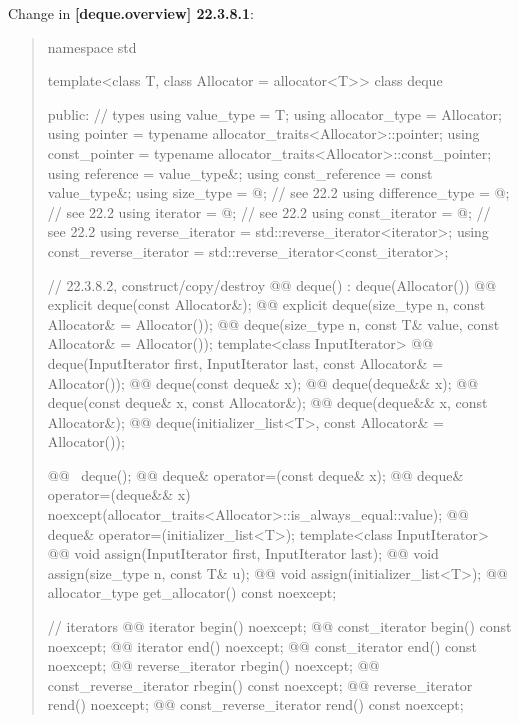 \documentclass{wg21}
\begin{document}
Change in \textbf{[deque.overview] 22.3.8.1}:
\begin{quote}
\begin{codeblock}
namespace std {
  template<class T, class Allocator = allocator<T>>
  class deque {
  public:
    // types
    using value_type             = T;
    using allocator_type         = Allocator;
    using pointer                = typename allocator_traits<Allocator>::pointer;
    using const_pointer          = typename allocator_traits<Allocator>::const_pointer;
    using reference              = value_type&;
    using const_reference        = const value_type&;
    using size_type              = @\impdef@; // see 22.2
    using difference_type        = @\impdef@; // see 22.2
    using iterator               = @\impdef@; // see 22.2
    using const_iterator         = @\impdef@; // see 22.2
    using reverse_iterator       = std::reverse_iterator<iterator>;
    using const_reverse_iterator = std::reverse_iterator<const_iterator>;

    // 22.3.8.2, construct/copy/destroy
    @@ deque() : deque(Allocator()) { }
    @@ explicit deque(const Allocator&);
    @@ explicit deque(size_type n, const Allocator& = Allocator());
    @@ deque(size_type n, const T& value, const Allocator& = Allocator());
    template<class InputIterator>
      @@ deque(InputIterator first, InputIterator last, const Allocator& = Allocator());
    @@ deque(const deque& x);
    @@ deque(deque&& x);
    @@ deque(const deque& x, const Allocator&);
    @@ deque(deque&& x, const Allocator&);
    @@ deque(initializer_list<T>, const Allocator& = Allocator());
    
    @@ ~deque();
    @@ deque& operator=(const deque& x);
    @@ deque& operator=(deque&& x)
      noexcept(allocator_traits<Allocator>::is_always_equal::value);
    @@ deque& operator=(initializer_list<T>);
    template<class InputIterator>
      @@ void assign(InputIterator first, InputIterator last);
    @@ void assign(size_type n, const T& u);
    @@ void assign(initializer_list<T>);
    @@ allocator_type get_allocator() const noexcept;

    // iterators
    @@ iterator               begin() noexcept;
    @@ const_iterator         begin() const noexcept;
    @@ iterator               end() noexcept;
    @@ const_iterator         end() const noexcept;
    @@ reverse_iterator       rbegin() noexcept;
    @@ const_reverse_iterator rbegin() const noexcept;
    @@ reverse_iterator       rend() noexcept;
    @@ const_reverse_iterator rend() const noexcept;

}}
\end{codeblock}
\end{quote}
\end{document}
